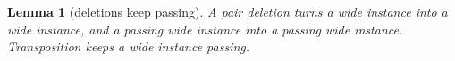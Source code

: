 \documentclass[11pt]{article}
\newtheorem{lemma}[theorem]{Lemma}
\begin{document}
\begin{lemma}[deletions keep passing]\label{lem:pass}
A pair deletion turns a wide instance into a wide instance, and a passing wide instance into a
passing wide instance. Transposition keeps a wide instance passing.
\end{lemma}
\end{document}
